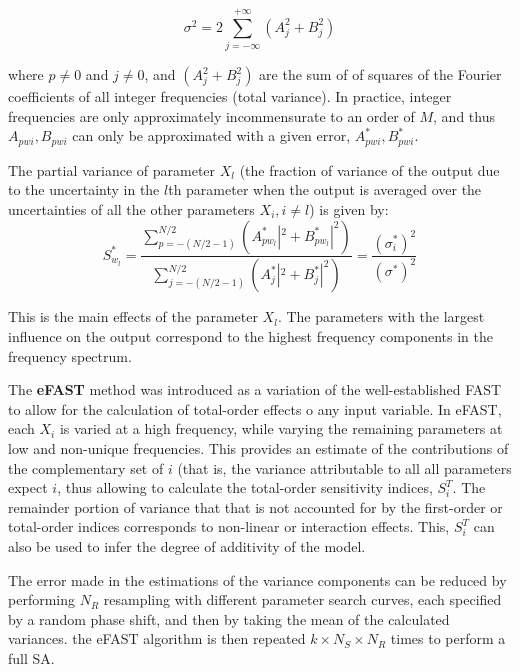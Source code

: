 \documentclass[12pt]{article}
\begin{document}
{\begin{equation}
\sigma^{2}=2\sum^{+\infty}_{j=-\infty}(A^{2}_{j}+B^{2}_{j})
\end{equation}

\vspace{0.5cm}
where $p\neq 0$ and $j\neq 0$, and $(A^{2}_{j}+B^{2}_{j})$ are the sum of of squares of the Fourier coefficients of all integer frequencies (total variance). In practice, integer frequencies are only approximately incommensurate to an order of $M$, and thus $A_{pwi}, B_{pwi}$ can only be approximated with a given error, $A^{*}_{pwi}, B^{*}_{pwi}$.

The partial variance of parameter $X_{l}$ (the fraction of variance of the output due to the uncertainty in the $l$th parameter when the output is averaged over the uncertainties of all the other parameters $X_{i}, i\neq l$) is given by:
\begin{equation}
S^{*}_{w_{l}}=\frac{\sum^{N/2}_{p=-(N/2-1)}(A^{*}_{pw_{l}}|^{2}+B^{*}_{pw_{l}}|^{2})}{\sum^{N/2}_{j=-(N/2-1)}(A^{*}_{j}|^{2}+B^{*}_{j}|^{2})}=\frac{(\sigma^{*}_{i})^{2}}{(\sigma^{*})^{2}}
\end{equation}

 This is the main effects of the parameter $X_{l}$. The parameters with the largest influence on the output correspond to the highest frequency components in the frequency spectrum. 

\vspace{0.5cm}
The \textbf{eFAST} method \cite{SaltelliFAST} was introduced as a variation of the well-established FAST to allow for the calculation of total-order effects o any input variable. In eFAST, each $X_{i}$ is varied at a high frequency, while varying the remaining parameters at low and non-unique frequencies. This provides an estimate of the contributions of the complementary set of $i$ (that is, the variance attributable to all all parameters expect $i$, thus allowing to calculate the total-order sensitivity indices, $S^{T}_{i}$. The remainder portion of variance that that is not accounted for by the first-order or total-order indices corresponds to non-linear or interaction effects. This,  $S^{T}_{i}$  can also be used to infer the degree of additivity of the model.

The error made in the estimations of the variance components can be reduced by performing $N_{R}$ resampling with different parameter search curves, each specified by a random phase shift,  and then by taking the mean of the calculated variances. the eFAST algorithm is then repeated $k\times N_{S}\times N_{R}$ times to perform a full SA.

}
\end{document}
